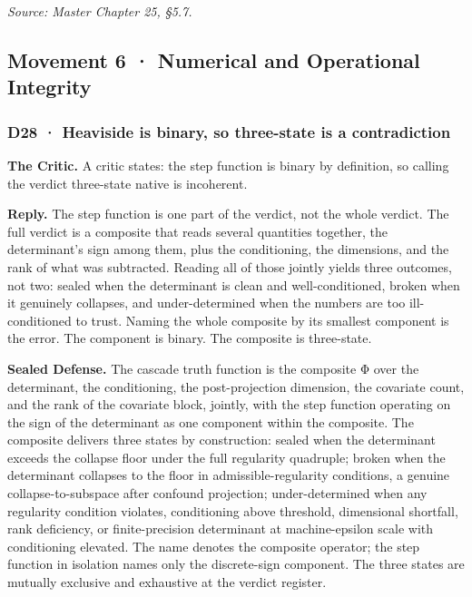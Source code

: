 \documentclass[10pt,twocolumn]{article}
\begin{document}
\emph{Source: Master Chapter 25, §5.7.}

\hypertarget{movement-6-numerical-and-operational-integrity}{%
\subsection{Movement 6 · Numerical and Operational
Integrity}\label{movement-6-numerical-and-operational-integrity}}

\hypertarget{d28-heaviside-is-binary-so-three-state-is-a-contradiction}{%
\subsubsection{D28 · Heaviside is binary, so three-state is a
contradiction}\label{d28-heaviside-is-binary-so-three-state-is-a-contradiction}}

\textbf{The Critic.} A critic states: the step function is binary by
definition, so calling the verdict three-state native is incoherent.

\textbf{Reply.} The step function is one part of the verdict, not the
whole verdict. The full verdict is a composite that reads several
quantities together, the determinant's sign among them, plus the
conditioning, the dimensions, and the rank of what was subtracted.
Reading all of those jointly yields three outcomes, not two: sealed when
the determinant is clean and well-conditioned, broken when it genuinely
collapses, and under-determined when the numbers are too ill-conditioned
to trust. Naming the whole composite by its smallest component is the
error. The component is binary. The composite is three-state.

\textbf{Sealed Defense.} The cascade truth function is the composite Φ
over the determinant, the conditioning, the post-projection dimension,
the covariate count, and the rank of the covariate block, jointly, with
the step function operating on the sign of the determinant as one
component within the composite. The composite delivers three states by
construction: sealed when the determinant exceeds the collapse floor
under the full regularity quadruple; broken when the determinant
collapses to the floor in admissible-regularity conditions, a genuine
collapse-to-subspace after confound projection; under-determined when
any regularity condition violates, conditioning above threshold,
dimensional shortfall, rank deficiency, or finite-precision determinant
at machine-epsilon scale with conditioning elevated. The name denotes
the composite operator; the step function in isolation names only the
discrete-sign component. The three states are mutually exclusive and
exhaustive at the verdict register.
\end{document}

